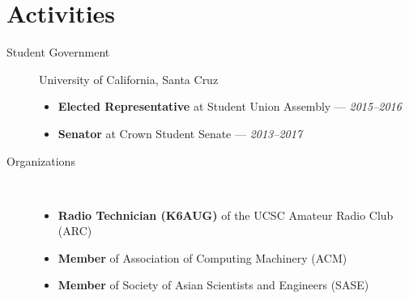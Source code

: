 \documentclass[10pt]{article}
\begin{document}
\section*{Activities}
\begin{description}
  \item[Student Government] University of California, Santa Cruz
    \begin{itemize}
      \item \textbf{Elected Representative} at Student Union Assembly --- \textit{2015--2016}
      \item \textbf{Senator} at Crown Student Senate --- \textit{2013--2017}
    \end{itemize}
  \item[Organizations] ~
    \begin{itemize}
      \item \textbf{Radio Technician (K6AUG)} of the UCSC Amateur Radio Club (ARC) 
      \item \textbf{Member} of Association of Computing Machinery (ACM)
      \item \textbf{Member} of Society of Asian Scientists and Engineers (SASE)
    \end{itemize}
\end{description}
\end{document}
